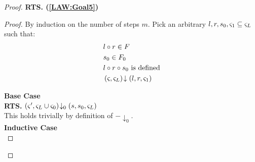 \begin{lemma}[]
\begin{proof}
%
\noindent\textbf{RTS. (\ref{LAW:Goal5})}\\
\begin{proof}
By induction on the number of steps $m$. Pick an arbitrary $l, r, s_0, \varsigma_{1} \subseteq \varsigma_{L}$ such that:
%
\begin{align}
	&l \circ r \in F \label{LAW2:Ass1}\\
	& s_0 \in F_0 \label{LAW2:Ass2}\\
	& l \circ r \circ s_0 \text{ is defined} \label{LAW2:Ass3} \\
	& \left(\varsigma_{}, \varsigma_{L}\right) \!\downarrow \left(l, r, \varsigma_{1}\right) \label{LAW2:Ass4}
\end{align}

\noindent\textbf{Base Case}\\
\textbf{RTS. } $\left(\varsigma_{}', \varsigma_{L} \cup \varsigma_{0}\right) \!\downarrow_{0} \left(s, s_0, \varsigma_{L}\right)$\\
This holds trivially by definition of $-\downarrow_{0}$.\\

\noindent\textbf{Inductive Case}\\


\end{proof}
\end{proof}
\end{lemma}
